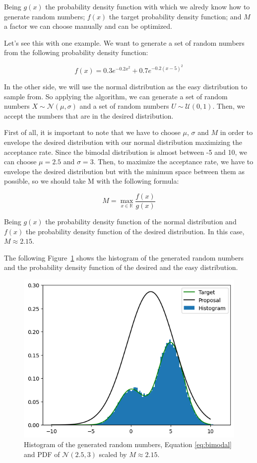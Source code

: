 \documentclass{article}
\begin{document}
Being \(g(x)\) the probability density function with which we alredy know how to generate random numbers; \(f(x)\) the target probability density function; and \(M\) a factor we can choose manually and can be optimized.

Let's see this with one example. We want to generate a set of random numbers from the following probability density function: 

\begin{equation} \label{eq:bimodal} f(x) = 0.3e^{-0.2x^2}+0.7e^{-0.2(x-5)^2} \end{equation}

In the other side, we will use the normal distribution as the easy distribution to sample from. So applying the algorithm, we can generate a set of random numbers \(X \sim \mathcal{N}(\mu,\sigma)\) and a set of random numbers \(U \sim \mathcal{U}(0,1)\). Then, we accept the numbers that are in the desired distribution. 

First of all, it is important to note that we have to choose \(\mu\), \(\sigma\) and \(M\) in order to envelope the desired distribution with our normal distribution maximizing the acceptance rate. Since the bimodal distribution is almost between -5 and 10, we can choose \(\mu = 2.5\) and \(\sigma = 3\). Then, to maximize the acceptance rate, we have to envelope the desired distribution but with the minimun space between them as possible, so we should take M with the following formula:

\begin{equation} 
	M = \max_{x \in \mathbb{R}} \frac{f(x)}{g(x)} 
\end{equation}

Being \(g(x)\) the probability density function of the normal distribution and \(f(x)\) the probability density function of the desired distribution. In this case, \(M \approx 2.15\).

The following Figure~\ref{fig:rejectionhist} shows the histogram of the generated random numbers and the probability density function of the desired and the easy distribution.

\begin{figure}[H]
	\centering
	\includegraphics[width=0.5\linewidth]{./Figures/AcceptanceRejection/hist.png}
	\caption{Histogram of the generated random numbers, Equation \eqref{eq:bimodal} and PDF of \(\mathcal{N}(2.5,3)\) scaled by \(M \approx 2.15\).}
	\label{fig:rejectionhist}
\end{figure}
\end{document}
